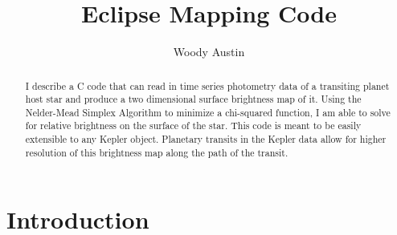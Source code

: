 \documentclass[iop]{emulateapj}
\begin{document}
\title{Eclipse Mapping Code}
\author{Woody Austin}

\begin{abstract}
I describe a C code that can read in time series photometry data of a transiting planet host star and produce a two dimensional surface brightness map of it. Using the Nelder-Mead Simplex Algorithm to minimize a chi-squared function, I am able to solve for relative brightness on the surface of the star. This code is meant to be easily extensible to any Kepler object. Planetary transits in the Kepler data allow for higher resolution of this brightness map along the path of the transit.
\end{abstract}
\maketitle

\section{Introduction \label{intro}}
\vspace{9mm}
\end{document}
